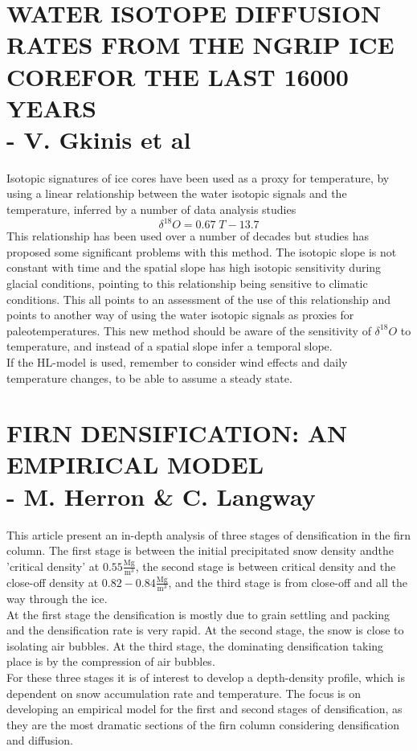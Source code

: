 \documentclass[11pt]{article}
\begin{document}
\newpage
\section{WATER ISOTOPE DIFFUSION RATES FROM THE NGRIP ICE COREFOR THE LAST 16000 YEARS \\ - V. Gkinis et al}
Isotopic signatures of ice cores have been used as a proxy for temperature, by using a linear relationship between the water isotopic signals and the temperature, inferred by a number of data analysis studies
\begin{equation}
	\delta^{18}O = 0.67 \; T - 13.7
	\label{eq:Iso_Temp_spatial_relation}
\end{equation}
This relationship has been used over a number of decades but studies has proposed some significant problems with this method. The isotopic slope is not constant with time and the spatial slope has high isotopic sensitivity during glacial conditions, pointing to this relationship being sensitive to climatic conditions.
This all points to an assessment of the use of this relationship and points to another way of using the water isotopic signals as proxies for paleotemperatures. This new method should be aware of the sensitivity of $\delta^{18}O$  to temperature, and instead of a spatial slope infer a temporal slope. \\

If the HL-model is used, remember to consider wind effects and daily temperature changes, to be able to assume a steady state.

\newpage
\section{FIRN DENSIFICATION: AN EMPIRICAL MODEL \\ - M. Herron \& C. Langway}
This article present an in-depth analysis of three stages of densification in the firn column. The first stage is between the initial precipitated snow density andthe 'critical density' at $0.55 \frac{\text{Mg}}{\text{m}^3}$, the second stage is between critical density and the close-off density at $0.82-0.84 \frac{\text{Mg}}{\text{m}^3}$, and the third stage is from close-off and all the way through the ice.\\
At the first stage the densification is mostly due to grain settling and packing and the densification rate is very rapid. At the second stage, the snow is close to isolating air bubbles. At the third stage, the dominating densification taking place is by the compression of air bubbles.\\
For these three stages it is of interest to develop a depth-density profile, which is dependent on snow accumulation rate and temperature. The focus is on developing an empirical model for the first and second stages of densification, as they are the most dramatic sections of the firn column considering densification and diffusion.
\end{document}
